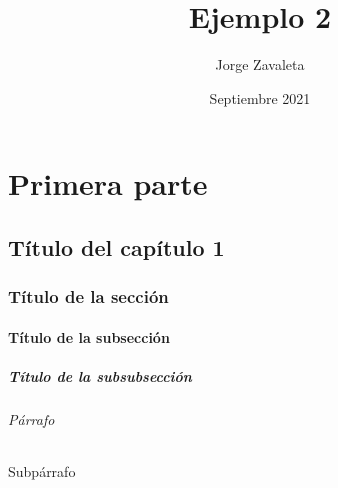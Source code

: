 \documentclass{book}
\title{Ejemplo 2}
\author{Jorge Zavaleta}
\date{Septiembre 2021}
\begin{document}
\maketitle
\tableofcontents

\part{Primera parte}

\chapter{Título del capítulo 1}
\lipsum[1]

\section{Título de la sección}
\lipsum[3-4]

\subsection{Título de la subsección}
\lipsum[5-6]

\subsubsection{Título de la subsubsección}
\lipsum[7-8]

\paragraph{Párrafo}
\lipsum[9]

\subparagraph{Subpárrafo}
\lipsum[10]
\end{document}
